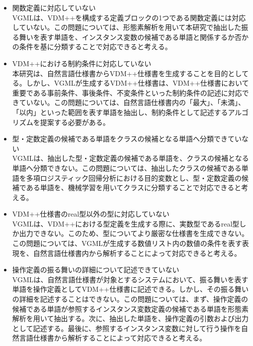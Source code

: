 \begin{itemize}
	\item 関数定義に対応していない\\VGMLは、VDM++を構成する定義ブロックの1つである関数定義には対応していない。この問題については、形態素解析を用いて本研究で抽出した振る舞いを表す単語を、インスタンス変数の候補である単語と関係するか否かの条件を基に分類することで対応できると考える。
	\item VDM++における制約条件に対応していない\\本研究は、自然言語仕様書からVDM++仕様書を生成することを目的としてる。しかし、VGMLが生成するVDM++仕様書は、VDM++仕様書において重要である事前条件、事後条件、不変条件といった制約条件の記述に対応できていない。この問題については、自然言語仕様書内の「最大」、「未満」、「以内」といった範囲を表す単語を抽出し、制約条件として記述するアルゴリズムを提案する必要がある。
	\item 型・定数定義の候補である単語をクラスの候補となる単語へ分類できていない\\VGMLは、抽出した型・定数定義の候補である単語を、クラスの候補となる単語へ分類できない。この問題については、抽出したクラスの候補である単語を多項ロジスティック回帰分析における目的変数とし、型・定数定義の候補である単語を、機械学習を用いてクラスに分類することで対応できると考える。
	\item VDM++仕様書のreal型以外の型に対応していない\\VGMLは、VDM++における型定義を生成する際に、実数型であるreal型しか出力できない。このため、型についてより厳密な仕様書を生成できない。この問題については、VGMLが生成する数値リスト内の数値の条件を表す表現を、自然言語仕様書内から解析することによって対応できると考える。
	\item 操作定義の振る舞いの詳細について記述できていない\\VGMLは、自然言語仕様書が対象とするシステムにおいて、振る舞いを表す単語を操作定義としてVDM++仕様書に記述できる。しかし、その振る舞いの詳細を記述することはできない。この問題については、まず、操作定義の候補である単語が参照するインスタンス変数定義の候補である単語を形態素解析を用いて抽出する。次に、抽出した単語を、操作定義の引数および出力として記述する。最後に、参照するインスタンス変数に対して行う操作を自然言語仕様書から解析することによって対応できると考える。
\end{itemize}

